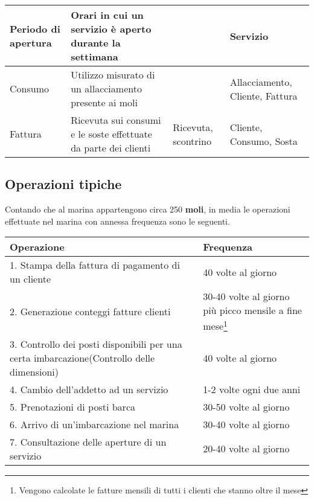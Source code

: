 \begin{center}
\begin{tabularx}{\textwidth}{|>{\RaggedRight}p{2cm}|p{7cm}|p{2.4cm}|>{\RaggedRight}X|}
        \hline
        Periodo di apertura & Orari in cui un servizio è aperto durante la settimana & & Servizio\\

        \hline
        Consumo & Utilizzo misurato di un allacciamento presente ai moli & & Allacciamento, Cliente, Fattura \\
       
        \hline
        Fattura & Ricevuta sui consumi e le soste effettuate da parte dei clienti & Ricevuta, scontrino & Cliente, Consumo, Sosta\\
        
        \hline
    \end{tabularx}
\end{center}

\subsection{Operazioni tipiche}
Contando che al marina appartengono circa 250 \textbf{moli}, in media le operazioni effettuate nel marina con annessa frequenza sono le seguenti.
\begin{center}
    \begin{tabularx}{\textwidth}{|p{90mm}|X|}
        \hline
        \rowcolor{gray!30}
        \textbf{Operazione} & \textbf{Frequenza}\\
        \hline
        1. Stampa della fattura di pagamento di un cliente & 40 volte al giorno\\

        \hline
        2. Generazione conteggi fatture clienti & 30-40 volte al giorno più picco mensile a fine mese\footnote{Vengono calcolate le fatture mensili di tutti i clienti che stanno oltre il mese}\\

        \hline
        3. Controllo dei posti disponibili per una certa imbarcazione(Controllo delle dimensioni)& 40 volte al giorno\\

        \hline
        4. Cambio dell'addetto ad un servizio & 1-2 volte ogni due anni\\

        \hline
        5. Prenotazioni di posti barca & 30-50 volte al giorno\\

        \hline
        6. Arrivo di un'imbarcazione nel marina & 30-40 volte al giorno\\

        \hline
        7. Consultazione delle aperture di un servizio & 20-40 volte al giorno\\

        \hline
    \end{tabularx}
\end{center}
